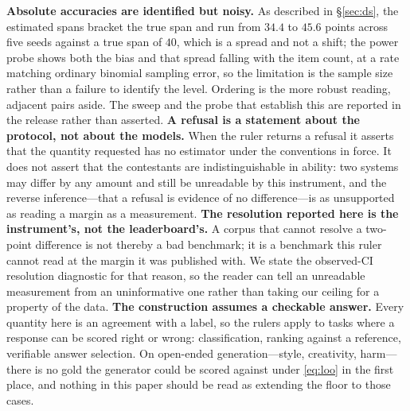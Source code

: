 \documentclass{article}
\begin{document}
\textbf{Absolute accuracies are identified but noisy.} As described in \S\ref{sec:ds}, the estimated spans bracket the true span and run from $34.4$ to $45.6$ points across five seeds against a true span of $40$, which is a spread and not a shift; the power probe shows both the bias and that spread falling with the item count, at a rate matching ordinary binomial sampling error, so the limitation is the sample size rather than a failure to identify the level. Ordering is the more robust reading, adjacent pairs aside. The sweep and the probe that establish this are reported in the release rather than asserted.
\textbf{A refusal is a statement about the protocol, not about the models.} When the ruler returns a refusal it asserts that the quantity requested has no estimator under the conventions in force. It does not assert that the contestants are indistinguishable in ability: two systems may differ by any amount and still be unreadable by this instrument, and the reverse inference---that a refusal is evidence of no difference---is as unsupported as reading a margin as a measurement.
\textbf{The resolution reported here is the instrument's, not the leaderboard's.} A corpus that cannot resolve a two-point difference is not thereby a bad benchmark; it is a benchmark this ruler cannot read at the margin it was published with. We state the observed-CI resolution diagnostic for that reason, so the reader can tell an unreadable measurement from an uninformative one rather than taking our ceiling for a property of the data.
\textbf{The construction assumes a checkable answer.} Every quantity here is an agreement with a label, so the rulers apply to tasks where a response can be scored right or wrong: classification, ranking against a reference, verifiable answer selection. On open-ended generation---style, creativity, harm---there is no gold the generator could be scored against under \eqref{eq:loo} in the first place, and nothing in this paper should be read as extending the floor to those cases.
\end{document}
